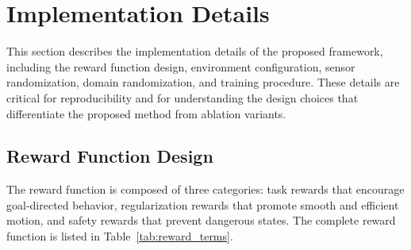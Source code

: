 \section{Implementation Details}
\label{sec:implementation}

This section describes the implementation details of the proposed framework, including the reward function design, environment configuration, sensor randomization, domain randomization, and training procedure. These details are critical for reproducibility and for understanding the design choices that differentiate the proposed method from ablation variants.

\subsection{Reward Function Design}
\label{sec:reward_function}

The reward function is composed of three categories: task rewards that encourage goal-directed behavior, regularization rewards that promote smooth and efficient motion, and safety rewards that prevent dangerous states. The complete reward function is listed in Table~\ref{tab:reward_terms}.

